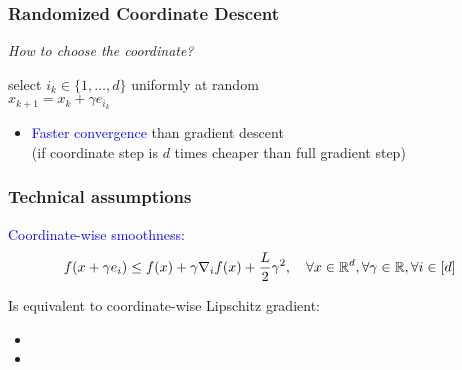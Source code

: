 \documentclass[aspectratio=149]{beamer}
\begin{document}
\begin{frame}
  \frametitle{Randomized Coordinate Descent}

  \textit{How to choose the coordinate?}

  \begin{block}{}
    \begin{center}
      select $i_k \in \{1, \dots, d\}$ uniformly at random\\
      $x_{k+1} = x_k + \gamma e_{i_k}$
    \end{center}
  \end{block}
  \vspace{1cm}
  \begin{itemize}
    \item \textcolor{blue}{Faster convergence} than gradient descent\\
          (if coordinate step is $d$ times cheaper than full gradient step)
  \end{itemize}
\end{frame}

\begin{frame}
  \frametitle{Technical assumptions}

  \begin{block}{}
    \textcolor{blue}{Coordinate-wise smoothness:}
    \begin{equation}
      f(x + \gamma e_i) \le f(x) + \gamma \nabla_i f(x) + \frac{L}{2}\gamma^2, \quad \forall x \in \mathbb{R}^d, \forall \gamma \in \mathbb{R}, \forall i \in [d]
    \end{equation}
  \end{block}
  Is equivalent to coordinate-wise Lipschitz gradient:
  \begin{equation}

  \end{equation}

  \begin{itemize}
    \item
    \item
  \end{itemize}

\end{frame}
\end{document}
